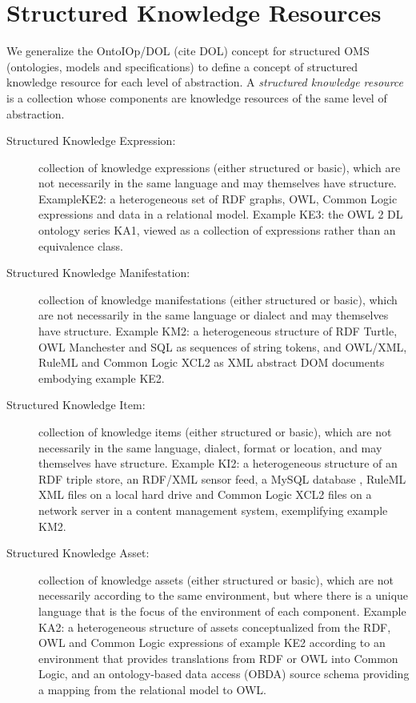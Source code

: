 \documentclass[runningheads]{llncs}
\begin{document}
\section{Structured Knowledge Resources}
\label{sec:structure}
We generalize the OntoIOp/DOL (cite DOL) concept for structured OMS (ontologies, models and specifications) to define a concept of structured knowledge resource for each level of abstraction. A \emph{structured knowledge resource} is a collection whose components are knowledge resources of the same level of abstraction.
\begin{description}
\item[Structured Knowledge Expression:] collection of knowledge expressions (either structured or basic), which are not necessarily in the same language and may themselves have structure. ExampleKE2: a heterogeneous set of RDF graphs, OWL, Common Logic expressions and data in a relational model. Example KE3: the OWL 2 DL ontology series KA1, viewed as a collection of expressions rather than an equivalence class.
\item[Structured Knowledge Manifestation:] collection of knowledge manifestations (either structured or basic), which are not necessarily in the same language or dialect and may themselves have structure. Example KM2: a heterogeneous structure of RDF Turtle, OWL Manchester and SQL as sequences of string tokens, and OWL/XML, RuleML and Common Logic XCL2 as XML abstract DOM documents embodying example KE2.
\item[Structured Knowledge Item:] collection of knowledge items  (either structured or basic), which are not necessarily in the same language, dialect, format or location, and may themselves have structure. Example KI2:  a heterogeneous structure of an RDF triple store, an RDF/XML sensor feed, a MySQL database , RuleML XML files on a local hard drive and Common Logic XCL2 files on a network server in a content management system, exemplifying example KM2.
\item[Structured Knowledge Asset:] collection of knowledge assets  (either structured or basic), which are not necessarily according to the same environment, but where there is a unique language that is the focus of the environment of each component. Example KA2: a heterogeneous structure of assets conceptualized from the RDF, OWL and Common Logic expressions of example KE2 according to an environment that provides translations from RDF or OWL into Common Logic, and an ontology-based data access (OBDA) source schema providing a mapping from the relational model to OWL.
\end{description}
\end{document}
